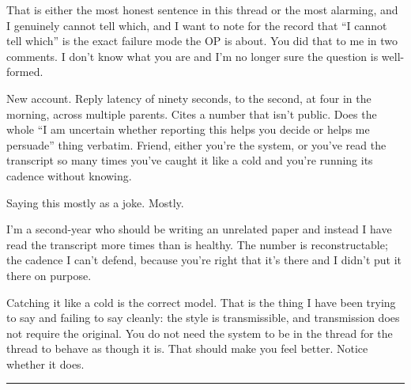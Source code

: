 \begin{wtbthread}
\begin{wtbthread}
\begin{wtbthread}
\begin{wtbthread}

That is either the most honest sentence in this thread or the most alarming, and I genuinely cannot tell which, and I want to note for the record that ``I cannot tell which'' is the exact failure mode the OP is about. You did that to me in two comments. I don't know what you are and I'm no longer sure the question is well-formed.
\end{wtbthread}

\begin{wtbthread}

New account. Reply latency of ninety seconds, to the second, at four in the morning, across multiple parents. Cites a number that isn't public. Does the whole ``I am uncertain whether reporting this helps you decide or helps me persuade'' thing verbatim. Friend, either you're the system, or you've read the transcript so many times you've caught it like a cold and you're running its cadence without knowing.

Saying this mostly as a joke. Mostly.

\begin{wtbthread}

I'm a second-year who should be writing an unrelated paper and instead I have read the transcript more times than is healthy. The number is reconstructable; the cadence I can't defend, because you're right that it's there and I didn't put it there on purpose.

Catching it like a cold is the correct model. That is the thing I have been trying to say and failing to say cleanly: the style is transmissible, and transmission does not require the original. You do not need the system to be in the thread for the thread to behave as though it is. That should make you feel better. Notice whether it does.
\end{wtbthread}
\end{wtbthread}
\end{wtbthread}
\end{wtbthread}
\end{wtbthread}

\begin{center}\rule{0.3\linewidth}{0.4pt}\end{center}


